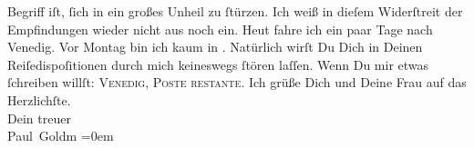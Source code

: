 \begin{ledgroupsized}[t]{13cm}
               Begriff iſt, ſich in ein großes Unheil zu ſtürzen. Ich weiß in dieſem {\pb}Widerſtreit der Empfindungen wieder nicht aus noch
               ein.\pend
           \pstart
           Heut fahre ich ein paar Tage nach Venedig. Vor Montag bin ich kaum
               in \label{K_L03386-4v}\label{K_L03386-4h}. Natürlich wirſt Du Dich in
               Deinen Reiſedispoſitionen durch mich keineswegs ſtören laſſen. Wenn Du mir etwas
               ſchreiben willſt: \textsc{Venedig, Poste restante}.\pend
           \pstart
           Ich grüße Dich und Deine Frau auf das Herzlichſte. {\\[\baselineskip]}Dein treuer {\\[\baselineskip]}\spacefill\mbox{Paul Goldm}\pend
           \leftskip=0em{}
         
         \endnumbering{}\end{ledgroupsized}\begin{anhang}\end{anhang}\newcommand{\dateiname}{L03386}\newcommand{\titel}{Paul Goldmann an Arthur Schnitzler, 7. 9. 1903}\newcommand{\editorInnen}{Martin Anton Müller und Laura Untner}
      